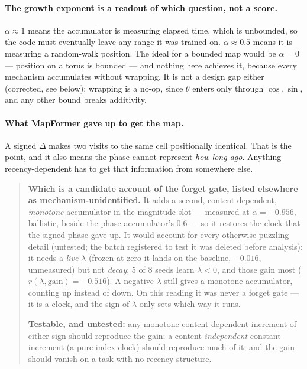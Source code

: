 \documentclass[11pt]{article}
\begin{document}
\paragraph{The growth exponent is a readout of which question, not a score.}
$\alpha\approx1$ means the accumulator is measuring elapsed time, which is unbounded,
so the code must eventually leave any range it was trained on. $\alpha\approx0.5$
means it is measuring a random-walk position. The ideal for a bounded map would be
$\alpha = 0$ --- position on a torus is bounded --- and nothing here achieves it,
because every mechanism accumulates without wrapping. It is not a design gap either
(corrected, see below): wrapping is a no-op, since $\theta$ enters only through
$\cos,\sin$, and any other bound breaks additivity.

\paragraph{What MapFormer gave up to get the map.} A signed $\Delta$ makes two
visits to the same cell positionally identical. That is the point, and it also means
the phase cannot represent \emph{how long ago}. Anything recency-dependent has to get
that information from somewhere else.

\begin{quote}\small
\textbf{Which is a candidate account of the forget gate, listed elsewhere as
mechanism-unidentified.} It adds a second, content-dependent, \emph{monotone}
accumulator in the magnitude slot --- measured at $\alpha = +0.956$, ballistic,
beside the phase accumulator's $0.6$ --- so it restores the clock that the signed
phase gave up. It would account for every otherwise-puzzling detail (untested; the
batch registered to test it was deleted before analysis): it needs a \emph{live}
$\lambda$ (frozen at zero it lands on the baseline, $-0.016$, unmeasured) but not
\emph{decay}; $5$ of $8$ seeds learn $\lambda<0$, and those gain most
($r(\lambda,\text{gain}) = -0.516$). A negative $\lambda$ still gives a monotone
accumulator, counting up instead of down. On this reading it was never a forget gate
--- it is a clock, and the sign of $\lambda$ only sets which way it runs.

\textbf{Testable, and untested:} any monotone content-dependent increment of either
sign should reproduce the gain; a content-\emph{independent} constant increment (a
pure index clock) should reproduce much of it; and the gain should vanish on a task
with no recency structure.
\end{quote}
\end{document}
